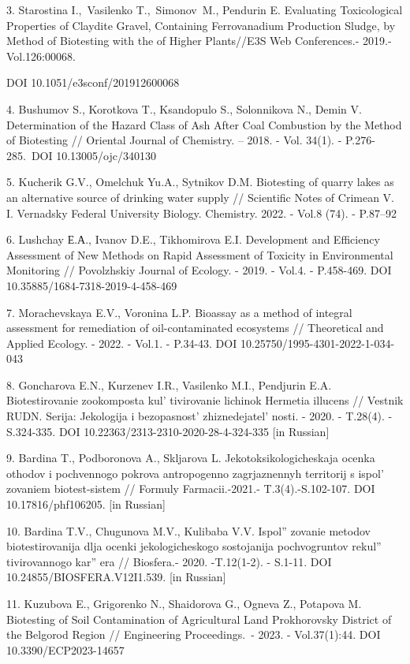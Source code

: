 3. Starostina I.,~Vasilenko T.,~Simonov~M., Pendurin E. Evaluating
Toxicological Properties of Claydite Gravel, Containing Ferrovanadium
Production Sludge, by Method of Biotesting with the of Higher
Plants//E3S Web Conferences.- 2019.- Vol.126:00068.

DOI 10.1051/e3sconf/201912600068

4. Bushumov S., Korotkova T., Ksandopulo S., Solonnikova N., Demin V.
Determination of the Hazard Class of Ash After Coal Combustion by the
Method of Biotesting // Oriental Journal of Chemistry. -- 2018. - Vol.
34(1). - P.276-285.~DOI 10.13005/ojc/340130~

5. Kucherik G.V., Omelchuk Yu.A., Sytnikov D.M. Biotesting of quarry
lakes as an alternative source of drinking water supply // Scientific
Notes of Crimean V. I. Vernadsky Federal University Biology. Chemistry.
2022. - Vol.8 (74). - P.87--92

6. Lushchay Е.А., Ivanov D.E., Tikhomirova E.I. Development and
Efficiency Assessment of New Methods on Rapid Assessment of Toxicity in
Environmental Monitoring // Povolzhskiy Journal of Ecology. - 2019. -
Vol.4. - P.458-469. DOI 10.35885/1684-7318-2019-4-458-469

7. Morachevskaya E.V., Voronina L.P. Bioassay as a method of integral
assessment for remediation of oil-contaminated ecosystems // Theoretical
and Applied Ecology. - 2022. - Vol.1. - P.34-43. DOI
10.25750/1995-4301-2022-1-034-043

8. Goncharova E.N., Kurzenev I.R., Vasilenko M.I., Pendjurin E.A.
Biotestirovanie zookomposta kul' tivirovanie lichinok
Hermetia illucens // Vestnik RUDN. Serija: Jekologija i
bezopasnost'{} zhiznedejatel' nosti. -
2020. - T.28(4). - S.324-335. DOI 10.22363/2313-2310-2020-28-4-324-335
{[}in Russian{]}

9. Bardina T., Podboronova A., Skljarova L. Jekotoksikologicheskaja
ocenka othodov i pochvennogo pokrova antropogenno zagrjaznennyh
territorij s ispol' zovaniem biotest-sistem // Formuly
Farmacii.-2021.- T.3(4).-S.102-107. DOI 10.17816/phf106205. {[}in
Russian{]}

10. Bardina T.V., Chugunova M.V., Kulibaba V.V.
Ispol'' zovanie metodov biotestirovanija
dlja ocenki jekologicheskogo sostojanija pochvogruntov
rekul'' tivirovannogo
kar'' era // Biosfera.- 2020. -T.12(1-2).
- S.1-11. DOI 10.24855/BIOSFERA.V12I1.539. {[}in Russian{]}

11. Kuzubova E., Grigorenko N., Shaidorova G., Ogneva Z., Potapova M.
Biotesting of Soil Contamination of Agricultural Land Prokhorovsky
District of the Belgorod Region // Engineering Proceedings.~- 2023. -
Vol.37(1):44. DOI 10.3390/ECP2023-14657


